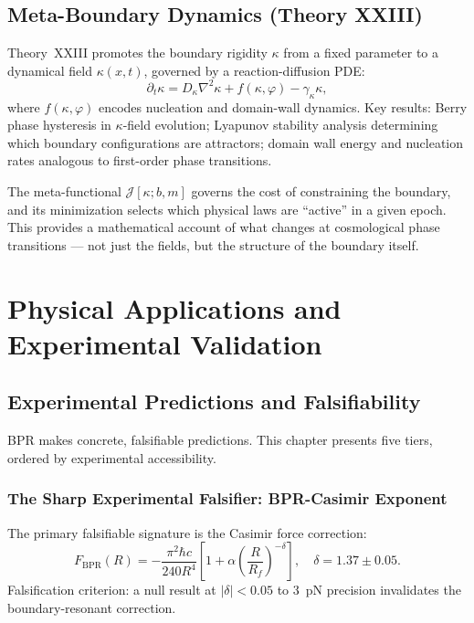 \documentclass[12pt,oneside]{book}
\theoremstyle{definition}
\begin{document}
\chapter{Meta-Boundary Dynamics (Theory XXIII)}
\label{chap:metaboundary}

Theory~XXIII promotes the boundary rigidity $\kappa$ from a fixed parameter to a
dynamical field $\kappa(x, t)$, governed by a reaction-diffusion PDE:
\begin{equation}
  \partial_t\kappa = D_\kappa\nabla^2\kappa + f(\kappa, \varphi) - \gamma_\kappa\kappa,
\end{equation}
where $f(\kappa,\varphi)$ encodes nucleation and domain-wall dynamics. Key results:
Berry phase hysteresis in $\kappa$-field evolution; Lyapunov stability analysis
determining which boundary configurations are attractors; domain wall energy and
nucleation rates analogous to first-order phase transitions.

The meta-functional $\mathcal{J}[\kappa; b, m]$ governs the cost of constraining
the boundary, and its minimization selects which physical laws are ``active'' in
a given epoch. This provides a mathematical account of what changes at cosmological
phase transitions --- not just the fields, but the structure of the boundary itself.

\part{Physical Applications and Experimental Validation}

\chapter{Experimental Predictions and Falsifiability}
\label{chap:experiments}

BPR makes concrete, falsifiable predictions. This chapter presents five tiers,
ordered by experimental accessibility.

\section{The Sharp Experimental Falsifier: BPR-Casimir Exponent}

The primary falsifiable signature is the Casimir force correction:
\begin{equation}
  \label{eq:casimir}
  F_{\mathrm{BPR}}(R) = -\frac{\pi^2\hbar c}{240 R^4}
  \left[1 + \alpha\!\left(\frac{R}{R_f}\right)^{-\delta}\right],
  \quad \delta = 1.37 \pm 0.05.
\end{equation}
Falsification criterion: a null result at $|\delta| < 0.05$ to $3$~pN precision
invalidates the boundary-resonant correction.
\end{document}
